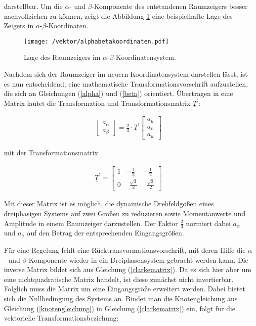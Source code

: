 darstellbar. Um die $\alpha$- und $\beta$-Komponente des entstandenen Raumzeigers besser nachvollziehen zu können, zeigt die Abbildung \ref{fig:alphabetakoordinaten} eine beispielhafte Lage des Zeigers in $\alpha$-$\beta$-Koordinaten.
\newpage

\begin{figure}[h]
	\centering
	\texttt{[image: /vektor/alphabetakoordinaten.pdf]}
	\label{fig:alphabetakoordinaten}
	\caption{Lage des Raumzeigers im $\alpha$-$\beta$-Koordinatensystem.}
\end{figure}

Nachdem sich der Raumzeiger im neuern Koordinatensystem darstellen lässt, ist es nun entscheidend, eine mathematische Transformationsvorschrift aufzustellen, die sich an Gleichungen (\ref{alpha}) und (\ref{beta}) orientiert. 
Übertragen in eine Matrix lautet die Transformation und Transformationsmatrix $\underline{T}^{\prime}$:

\begin{align}
	\begin{bmatrix}
	a_{\alpha} \\
	a_{\beta} 
	\end{bmatrix}
	=\frac{2}{3}\cdot\underline{T}^{\prime}
	\begin{bmatrix}
	a_{u} \\
	a_{v} \\
	a_{w}
	\end{bmatrix}
	\label{clarkevektor}
\end{align}

mit der Transformationsmatrix

\begin{align}
	\underline{T}^{\prime} = 
	\begin{bmatrix}
		1 & -\frac{1}{2} & -\frac{1}{2}  \\
		0 & ~~\frac{\sqrt{3}}{2} & ~~\frac{\sqrt{3}}{2}
	\end{bmatrix}
	\label{clarkematrix}
\end{align}

Mit dieser Matrix ist es möglich, die dynamische Drehfeldgößen eines dreiphasigen Systems auf zwei Größen zu reduzieren sowie Momentanwerte und Amplitude in einem Raumzeiger darzustellen.
Der Faktor $\frac{2}{3}$ normiert dabei $a_{\alpha}$ und $a_{\beta}$ auf den Betrag der entsprechenden Eingangsgrößen.

Für eine Regelung fehlt eine Rücktransvormationsvorschrift, mit deren Hilfe die $\alpha$- und $\beta$-Komponente wieder in ein Dreiphasensystem gebracht werden kann.
Die inverse Matrix bildet sich aus Gleichung (\ref{clarkematrix}). 
Da es sich hier aber um eine nichtquadratische Matrix handelt, ist diese zunächst nicht invertierbar.
Folglich muss die Matrix um eine Eingangsgröße erweitert werden.
Dabei bietet sich die Nullbedingung des Systems an.
Bindet man die Knotengleichung aus Gleichung (\ref{knotengleichung}) in Gleichung (\ref{clarkematrix}) ein, folgt für die vektorielle Transformationsbeziehung:

